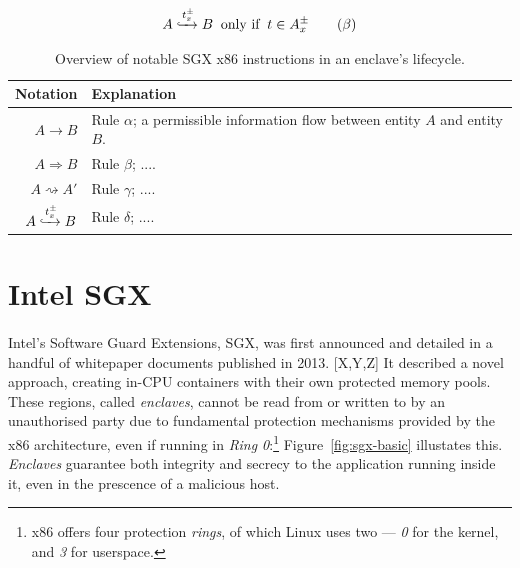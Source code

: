 \begin{equation}
    A \xhookrightarrow[]{t^{\pm}_{x}} B \;\; \text{only if} \;\; t \in A_{x}^{\pm} \tag{$\beta$}
\end{equation}

\begin{table}
    \centering
    \newcommand\tableTop{\rule{0pt}{3ex}}
    \newcommand\tableMid{\rule{0pt}{3ex}}
    \newcommand\tableBottom{\rule[-2ex]{0pt}{0pt}}
    \begin{tabular}{r p{10cm}} 
        \hline
        Notation & Explanation \\ [0.1ex] 
        \hline
            \tableTop{$A \rightarrow B$} & \tableTop{Rule $\alpha$; a permissible information flow between entity $A$ and entity $B$.} \\
            
            $A \Rightarrow B$ & \tableMid{Rule $\beta$; ....} \\

            $A \rightsquigarrow A'$ & \tableMid{Rule $\gamma$; ....} \\
            
            $A \xhookrightarrow[]{t^{\pm}_{x}} B$ & \tableMid{Rule $\delta$; ....} \tableBottom \\
    \end{tabular}
    \vspace{5mm}
    \caption{Overview of notable SGX x86 instructions in an enclave's lifecycle.}
    \label{table:ifc-notation}
\end{table}






\section{Intel SGX}

\paragraph{} Intel's Software Guard Extensions, SGX, was first announced and detailed in a handful of whitepaper documents published in 2013. [X,Y,Z] It described a novel approach, creating in-CPU containers with their own protected memory pools. These regions, called \textit{enclaves}, cannot be read from or written to by an unauthorised party due to fundamental protection mechanisms provided by the x86 architecture, even if running in \textit{Ring 0}:\footnote{x86 offers four protection \textit{rings}, of which Linux uses two --- \textit{0} for the kernel, and \textit{3} for userspace.} Figure~\ref{fig:sgx-basic} illustates this. \textit{Enclaves} guarantee both integrity and secrecy to the application running inside it, even in the prescence of a malicious host.


